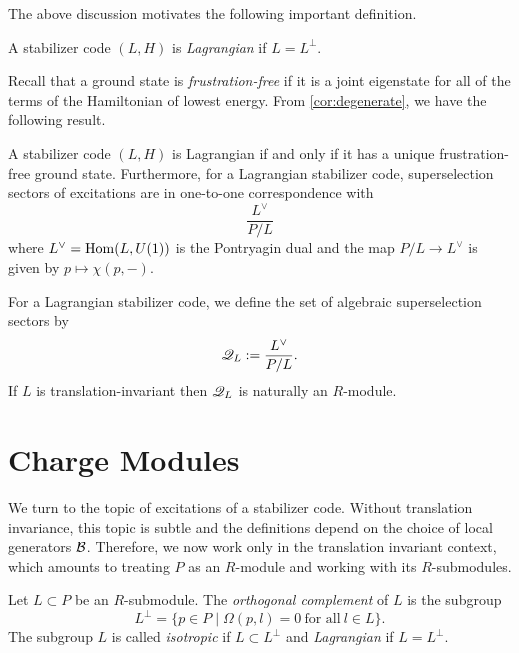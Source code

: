 \documentclass[11pt]{amsart}
\begin{document}
The above discussion motivates the following important definition.
\begin{defn}
A stabilizer code $(L,H)$ is \emph{Lagrangian} if $L=L^\perp$.
\end{defn}

Recall that a ground state is \emph{frustration-free} if it is a joint eigenstate for all of the terms of the Hamiltonian of lowest energy.
From \cref{cor:degenerate}, we have the following result.
\begin{cor}\label{cor:superselection}
A stabilizer code $(L,H)$ is Lagrangian if and only if it has a unique frustration-free ground state.  Furthermore, for a Lagrangian stabilizer code, superselection sectors of excitations are in one-to-one correspondence with
\[ \frac{L^{\vee}}{P/L}\]
where $L^\vee = \operatorname{Hom}(L,U(1))$ is the Pontryagin dual and the map $P/L \to L^\vee$ is given by $p \mapsto \chi(p,-)$.
\end{cor}
\begin{defn}
For a Lagrangian stabilizer code, we define the set of algebraic superselection sectors by
\[ \mathscr{Q}_L:=\frac{L^{\vee}}{P/L}.\]
If $L$ is translation-invariant then $\mathscr{Q}_L$ is naturally an $R$-module. 
\end{defn}


\section{Charge Modules}







We turn to the topic of excitations of a stabilizer code. Without translation invariance, this topic is subtle and the definitions depend on the choice of local generators $\mathcal{B}$. Therefore, we now work only in the translation invariant context, which amounts to treating $P$ as an $R$-module and working with its $R$-submodules.

\begin{defn}
 Let $ L \subset P$ be an $R$-submodule. The \emph{orthogonal complement} of $L$ is the subgroup
\[L^\perp =  \{ p \in P \mid \Omega(p,l)=0  \ \text{for all} \ l \in L \}.\]
The subgroup $L$ is called \emph{isotropic} if $L\subset L^\perp$ and \emph{Lagrangian} if $L=L^\perp$.
\end{defn}
\end{document}
